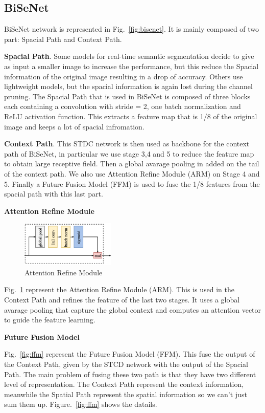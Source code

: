 \documentclass[conference]{IEEEtran}
\begin{document}
\subsection{BiSeNet}

BiSeNet network is represented in Fig.~\ref{fig:bisenet}. It is mainly composed of two part: Spacial Path and Context Path. 

\textbf{Spacial Path}.
Some models for real-time semantic segmentation decide to give as input a smaller image to increase the performance, but this reduce the Spacial
information of the original image resulting in a drop of accuracy. Others use lightweight models, but the spacial information is again
lost during the channel pruning. The Spacial Path that is used in BiSeNet is composed of three blocks each containing a convolution
with stride = 2, one batch normalization and ReLU activation function. This extracts a feature map that is 1/8 of the original image and
keeps a lot of spacial infromation. 

\textbf{Context Path}.
This STDC network is then used as backbone for the context path of BiSeNet, in particular we use stage 3,4 and 5 to reduce the 
feature map to obtain large receptive field. Then a global avarage pooling in added on the tail of the context path. We also use
Attention Refine Module (ARM) on Stage 4 and 5. Finally a Future Fusion Model (FFM) is used to fuse the 1/8
features from the spacial path with this last part.

\textbf{Attention Refine Module}
\begin{figure}[tp]
\centerline{\includegraphics[width=0.4\textwidth]{figures/ARM}}
\caption{Attention Refine Module}
\label{fig:arm}
\end{figure}

Fig.~\ref{fig:arm} represent the Attention Refine Module (ARM). This is used in the Context Path and refines the feature of the last
two stages. It uses a global avarage pooling that capture the global context and computes an attention vector to guide the feature learning.

\textbf{Future Fusion Model}

Fig.~\ref{fig:ffm} represent the Future Fusion Model (FFM). This fuse the output of the Context Path, given by the STCD network with 
the output of the Spacial Path. The main problem of fusing these two path is that they have two different level of representation. The
Context Path represent the context information, meanwhile the Spatial Path represent the spatial information so we can't just sum them
up. Figure.~\ref{fig:ffm} shows the datails. 
\end{document}
